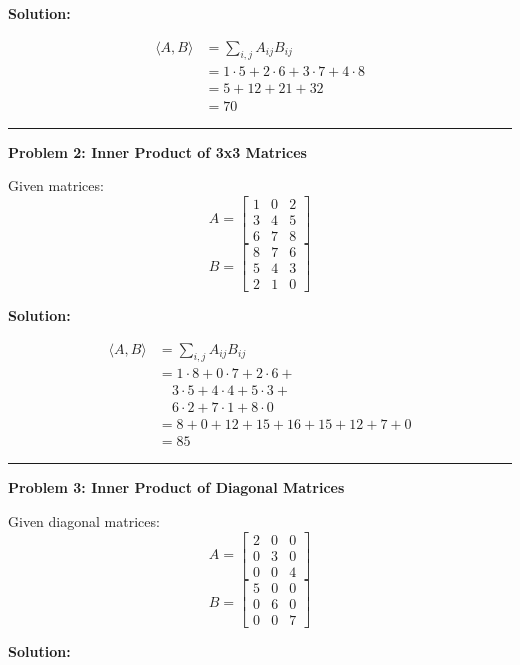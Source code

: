 \documentclass[
  letterpaper,
  DIV=11,
  numbers=noendperiod]{scrreprt}
\theoremstyle{plain}
\theoremstyle{definition}
\theoremstyle{remark}
\begin{document}
\textbf{Solution:}

\begin{align*}
\langle A,B \rangle &= \sum_{i,j} A_{ij} B_{ij} \\
&= 1\cdot5 + 2\cdot6 + 3\cdot7 + 4\cdot8 \\
&= 5 + 12 + 21 + 32 \\
&= 70
\end{align*}

\begin{center}\rule{0.5\linewidth}{0.5pt}\end{center}

\textbf{Problem 2: Inner Product of 3x3 Matrices}

Given matrices: \[A=\begin{bmatrix}1&0&2\\3&4&5\\6&7&8\end{bmatrix}\]
\[B=\begin{bmatrix}8&7&6\\5&4&3\\2&1&0\end{bmatrix}\]

\textbf{Solution:}

\begin{align*}
\langle A,B \rangle &= \sum_{i,j} A_{ij} B_{ij} \\
&= 1\cdot8 + 0\cdot7 + 2\cdot6 + \\
&\quad 3\cdot5 + 4\cdot4 + 5\cdot3 + \\
&\quad 6\cdot2 + 7\cdot1 + 8\cdot0 \\
&= 8 + 0 + 12 + 15 + 16 + 15 + 12 + 7 + 0 \\
&= 85
\end{align*}

\begin{center}\rule{0.5\linewidth}{0.5pt}\end{center}

\textbf{Problem 3: Inner Product of Diagonal Matrices}

Given diagonal matrices:
\[A=\begin{bmatrix}2&0&0\\0&3&0\\0&0&4\end{bmatrix}\]
\[B=\begin{bmatrix}5&0&0\\0&6&0\\0&0&7\end{bmatrix}\]

\textbf{Solution:}
\end{document}

